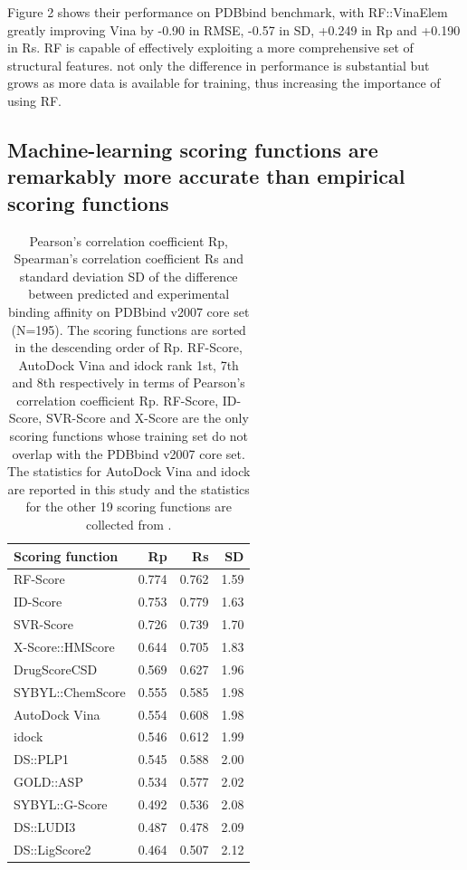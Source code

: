 \documentclass[journal=jacsat,manuscript=article]{achemso}
\begin{document}
Figure 2 shows their performance on PDBbind benchmark, with RF::VinaElem greatly improving Vina by -0.90 in RMSE, -0.57 in SD, +0.249 in Rp and +0.190 in Rs.
RF is capable of effectively exploiting a more comprehensive set of structural features.
not only the difference in performance is substantial but grows as more data is available for training, thus increasing the importance of using RF.

\subsection{Machine-learning scoring functions are remarkably more accurate than empirical scoring functions}

\begin{table}
\caption{Pearson's correlation coefficient Rp, Spearman's correlation coefficient Rs and standard deviation SD of the difference between predicted and experimental binding affinity on PDBbind v2007 core set (N=195). The scoring functions are sorted in the descending order of Rp. RF-Score, AutoDock Vina and idock rank 1st, 7th and 8th respectively in terms of Pearson's correlation coefficient Rp. RF-Score, ID-Score, SVR-Score and X-Score are the only scoring functions whose training set do not overlap with the PDBbind v2007 core set. The statistics for AutoDock Vina and idock are reported in this study and the statistics for the other 19 scoring functions are collected from \cite{1313,564,1305,1295}.}
\label{tbl:sf}
\begin{tabular}{lrrr}
\hline
Scoring function & Rp & Rs & SD\\
\hline
RF-Score & 0.774 & 0.762 & 1.59\\
ID-Score & 0.753 & 0.779 & 1.63\\
SVR-Score & 0.726 & 0.739 & 1.70\\
X-Score::HMScore & 0.644 & 0.705 & 1.83\\
DrugScoreCSD & 0.569 & 0.627 & 1.96\\
SYBYL::ChemScore & 0.555 & 0.585 & 1.98\\
AutoDock Vina & 0.554 & 0.608 & 1.98\\
idock & 0.546 & 0.612 & 1.99\\
DS::PLP1 & 0.545 & 0.588 & 2.00\\
GOLD::ASP & 0.534 & 0.577 & 2.02\\
SYBYL::G-Score & 0.492 & 0.536 & 2.08\\
DS::LUDI3 & 0.487 & 0.478 & 2.09\\
DS::LigScore2 & 0.464 & 0.507 & 2.12\\

\end{tabular}
\end{table}
\end{document}
